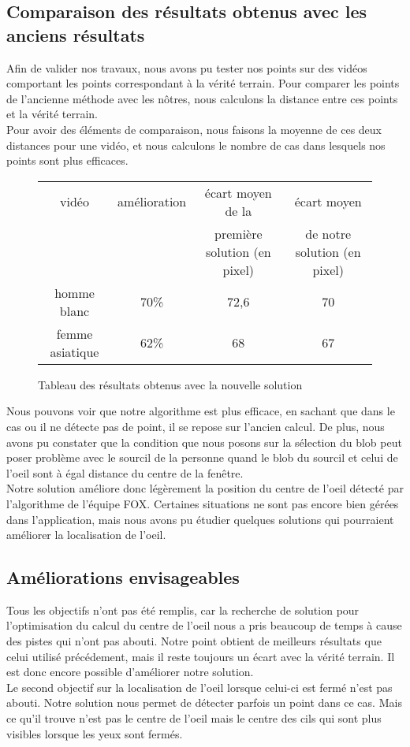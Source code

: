 \subsection{Comparaison des résultats obtenus avec les anciens résultats}
Afin de valider nos travaux, nous avons pu tester nos points sur des vidéos comportant les points correspondant à
la vérité terrain. Pour comparer les points de l'ancienne méthode avec les nôtres, nous calculons la
distance entre ces points et la vérité terrain.\\

Pour avoir des éléments de comparaison, nous faisons la moyenne de ces deux distances pour une vidéo, et nous calculons
le nombre de cas dans lesquels nos points sont plus efficaces.\\

\begin{figure}[H]
  \begin{tabular}{|c|c|c|c|}
  \hline
  vidéo & amélioration & écart moyen de la & écart moyen \\
  & & première solution (en pixel) & de notre solution (en pixel)\\
  \hline
  homme blanc & 70\% & 72,6 & 70\\
  \hline
  femme asiatique & 62\% & 68 & 67\\
  \hline
  \end{tabular}
  \caption{Tableau des résultats obtenus avec la nouvelle solution}
\end{figure}

Nous pouvons voir que notre algorithme est plus efficace, en sachant que dans le cas ou il ne détecte pas de point, il se repose sur l'ancien
calcul. De plus, nous avons pu constater que la condition que nous posons sur la sélection du blob peut poser problème 
avec le sourcil de la personne quand le blob du sourcil et celui de l'oeil sont à égal distance du centre de la fenêtre.\\

Notre solution améliore donc légèrement la position du centre de l'oeil détecté par l'algorithme de l'équipe FOX. Certaines
situations ne sont pas encore bien gérées dans l'application, mais nous avons pu étudier quelques solutions qui pourraient améliorer
la localisation de l'oeil.

\subsection{Améliorations envisageables}
Tous les objectifs n'ont pas été remplis, car la recherche de solution pour l'optimisation du calcul du centre de l'oeil
nous a pris beaucoup de temps à cause des pistes qui n'ont pas abouti. Notre point obtient de meilleurs résultats
que celui utilisé précédement, mais il reste toujours un écart avec la vérité terrain. Il est donc encore possible
d'améliorer notre solution.\\

Le second objectif sur la localisation de l'oeil lorsque celui-ci est fermé n'est pas abouti. Notre solution
nous permet de détecter parfois un point dans ce cas. Mais ce qu'il trouve n'est pas le centre de l'oeil mais le
centre des cils qui sont plus visibles lorsque les yeux sont fermés.